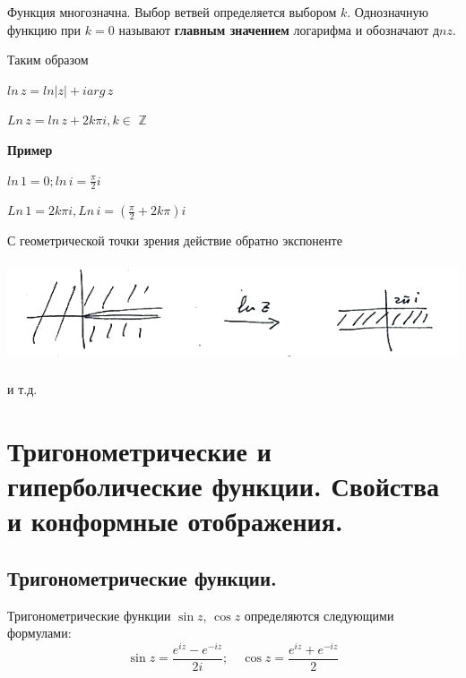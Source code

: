 \documentclass[a4paper, 12pt]{report}
\begin{document}
\par\bigskip
Функция многозначна. Выбор ветвей определяется выбором $k$. Однозначную  функцию при $k=0$ называют 
\textbf{главным значением} логарифма и обозначают $дnz$.
\par\bigskip Таким образом
\par\bigskip
 $ln\,z=ln|z|+iarg\,z$
\par\bigskip
$Ln\,z=ln\,z+2k\pi i,$\quad$ k\in$ $\mathbb{Z}$
\par\bigskip
\textbf{Пример}
\par\bigskip
$ln\,1=0;$\quad$ ln\,i=\frac{\pi}{2}i$
\par\bigskip
$Ln\,1=2k\pi i,$\quad$ Ln\,i=(\frac{\pi}{2}+2k\pi)i$
\par\bigskip
С геометрической точки зрения действие обратно экспоненте
\par\bigskip
\includegraphics[width=14cm, height=3cm]{exponenta 7/log.png}
\par\bigskip
и т.д.



\section{Тригонометрические и гиперболические функции. Свойства и конформные отображения.}
\subsection{Тригонометрические функции.}
Тригонометрические функции $\sin{z}$, $\cos{z}$ определяются следующими формулами:
\[ \sin{z}=\frac{e^{iz}-e^{-iz}}{2i}; \quad \cos{z}=\frac{e^{iz}+e^{-iz}}{2}\]
\end{document}
